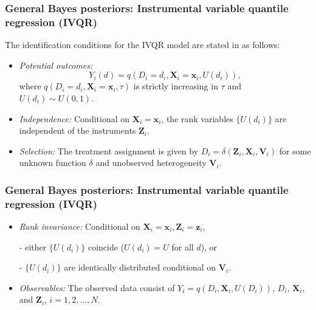 \documentclass[12pt, compress]{beamer}
\begin{document}
\begin{frame}
	\frametitle{General Bayes posteriors: Instrumental variable quantile regression (IVQR)}
The identification conditions for the IVQR model are stated in \cite{Chernozhukov2005} as follows:
\begin{itemize}
    \item \textit{Potential outcomes:}  
\[
Y_i(d)=q(D_i=d_i,\mathbf{X}_i=\mathbf{x}_i,U(d_i)),
\]
where $q(D_i=d_i,\mathbf{X}_i=\mathbf{x}_i,\tau)$ is strictly increasing in $\tau$ and $U(d_i)\sim U(0,1)$.  

\item \textit{Independence:} Conditional on $\mathbf{X}_i=\mathbf{x}_i$, the rank variables $\{U(d_i)\}$ are independent of the instruments $\mathbf{Z}_i$.  

\item \textit{Selection:} The treatment assignment is given by $D_i=\delta(\mathbf{Z}_i,\mathbf{X}_i,\mathbf{V}_i)$ for some unknown function $\delta$ and unobserved heterogeneity $\mathbf{V}_i$.  
\end{itemize}

\end{frame}

\begin{frame}
	\frametitle{General Bayes posteriors: Instrumental variable quantile regression (IVQR)}
\begin{itemize}
\item \textit{Rank invariance:} Conditional on $\mathbf{X}_i=\mathbf{x}_i,\mathbf{Z}_i=\mathbf{z}_i$,

- either $\{U(d_i)\}$ coincide ($U(d_i)=U$ for all $d$), or
  
- $\{U(d_i)\}$ are identically distributed conditional on $\mathbf{V}_i$.  

\item \textit{Observables:} The observed data consist of $Y_i=q(D_i,\mathbf{X}_i,U(D_i))$, $D_i$, $\mathbf{X}_i$, and $\mathbf{Z}_i$, $i=1,2,\dots,N$.  
\end{itemize}
\end{frame}
\end{document}
